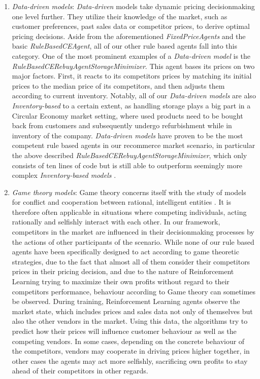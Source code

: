 \begin{enumerate}
	\item \emph{Data-driven models}: \emph{Data-driven} models take dynamic pricing decisionmaking one level further. They utilize their knowledge of the market, such as customer preferences, past sales data or competitor prices, to derive optimal pricing decisions. Aside from the aforementioned \emph{FixedPriceAgents} and the basic \emph{RuleBasedCEAgent}, all of our other rule based agents fall into this category. One of the most prominent examples of a \emph{Data-driven model} is the \emph{RuleBasedCERebuyAgentStorageMinimizer}. This agent bases its prices on two major factors. First, it reacts to its competitors prices by matching its initial prices to the median price of its competitors, and then adjusts them according to current inventory. Notably, all of our \emph{Data-driven models} are also \emph{Inventory-based} to a certain extent, as handling storage plays a big part in a Circular Economy market setting, where used products need to be bought back from customers and subsequently undergo refurbishment while in inventory of the company. \emph{Data-driven models} have proven to be the most competent rule based agents in our recommerce market scenario, in particular the above described \emph{RuleBasedCERebuyAgentStorageMinimizer}, which only consists of ten lines of code but is still able to outperform seemingly more complex \emph{Inventory-based models} .

	\item \emph{Game theory models}: \label{bullet:GameTheory}Game theory concerns itself with the study of models for conflict and cooperation between rational, intelligent entities \cite{GameTheory}. It is therefore often applicable in situations where competing individuals, acting rationally and selfishly interact with each other. In our framework, competitors in the market are influenced in their decisionmaking processes by the actions of other participants of the scenario. While none of our rule based agents have been specifically designed to act according to game theoretic strategies, due to the fact that almost all of them consider their competitors prices in their pricing decision, and due to the nature of Reinforcement Learning trying to maximize their own profits without regard to their competitors performance, behaviour according to Game theory can sometimes be observed.  During training, Reinforcement Learning agents observe the market state, which includes prices and sales data not only of themselves but also the other vendors in the market. Using this data, the algorithms try to predict how their prices will influence customer behaviour as well as the competing vendors. In some cases, depending on the concrete behaviour of the competitors, vendors may cooperate in driving prices higher together, in other cases the agents may act more selfishly, sacrificing own profits to stay ahead of their competitors in other regards. 


\end{enumerate}
